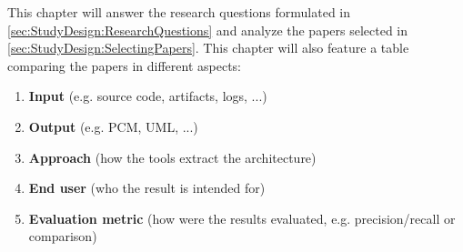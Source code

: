 This chapter will answer the research questions formulated in \ref{sec:StudyDesign:ResearchQuestions} and analyze the papers selected in \ref{sec:StudyDesign:SelectingPapers}.
This chapter will also feature a table comparing the papers in different aspects:
\begin{enumerate}
	\item \textbf{Input} (e.g. source code, artifacts, logs, ...)
	\item \textbf{Output} (e.g. PCM, UML, ...)
	\item \textbf{Approach} (how the tools extract the architecture)
	\item \textbf{End user} (who the result is intended for)
	\item \textbf{Evaluation metric} (how were the results evaluated, e.g. precision/recall or comparison)
\end{enumerate}